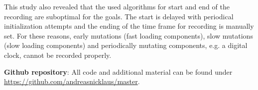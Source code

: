 \documentclass[a4paper, 12pt]{article}
\makeatletter
\renewcommand\listoffigures{%
  \section{\listfigurename}%
  \@mkboth{\MakeUppercase\listfigurename}{\MakeUppercase\listfigurename}%
  \@starttoc{lof}%
}
\renewcommand\listoftables{%
  \section{\listtablename}%
  \@mkboth{\MakeUppercase\listtablename}{\MakeUppercase\listtablename}%
  \@starttoc{lot}%
}
\renewcommand\lstlistoflistings{
  \section{\lstlistlistingname}
  \@starttoc{lol}%
}
\makeatother
\begin{document}
This study also revealed that the used algorithms for start and end of the recording are suboptimal for the goals. 
The start is delayed with periodical initialization attempts and the ending of the time frame for recording is manually set.
For these reasons, early mutations (fast loading components), slow mutations (slow loading components) and periodically mutating components, e.g. a digital clock, cannot be recorded properly.

\pagebreak

\appendix



\printnoidxglossary[
  type=\acronymtype,
  nonumberlist,
  nogroupskip,
]

{}

\textbf{Github repository}: All code and additional material can be found under \url{https://github.com/andreasnicklaus/master}.

\end{document}

